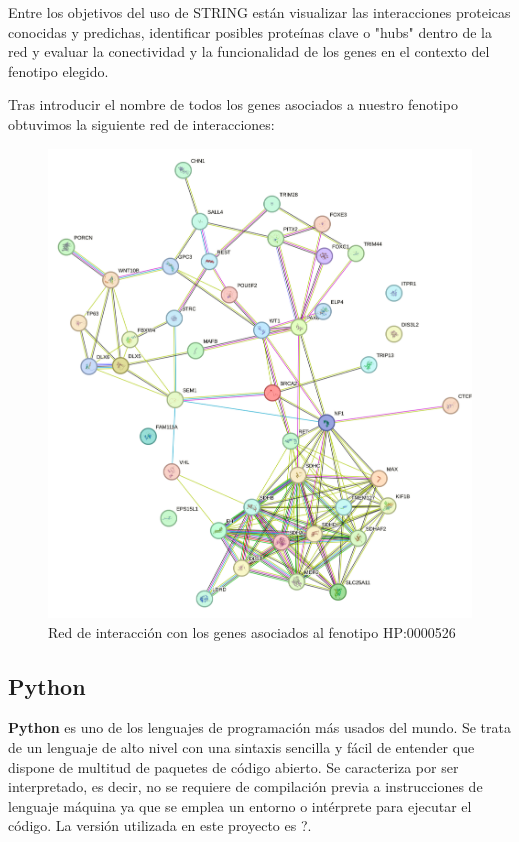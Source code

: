 Entre los objetivos del uso de STRING están visualizar las interacciones proteicas conocidas y predichas, identificar posibles proteínas clave o "hubs" dentro de la red y evaluar la conectividad y la funcionalidad de los genes en el contexto del fenotipo elegido.
	
Tras introducir el nombre de todos los genes asociados a nuestro fenotipo obtuvimos la siguiente red de interacciones:

\newpage

\begin{figure}[h] %
	\centering
	\includegraphics[width=1\textwidth]{figures/red_interaccion_aniridia.png} %
	\caption{Red de interacción con los genes asociados al fenotipo HP:0000526} %
	\label{fig:mi-imagen} %
\end{figure}

\subsection{Python}
\textbf{Python} es uno de los lenguajes de programación más usados del mundo. Se trata de un lenguaje de alto nivel con una sintaxis sencilla y fácil de entender que dispone de multitud de paquetes de código abierto. Se caracteriza por ser interpretado, es decir, no se requiere de compilación previa a instrucciones de lenguaje máquina ya que se emplea un entorno o intérprete para ejecutar el código. La versión utilizada en este proyecto es ?.

